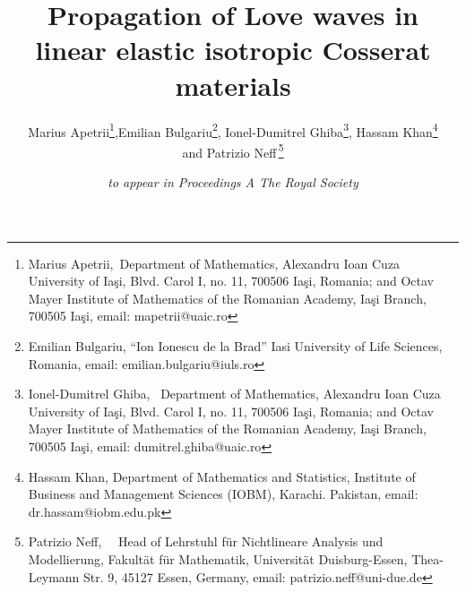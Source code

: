 \documentclass[10pt]{article}
\begin{document}
	
	\title{\vspace*{-1.75cm}   {Propagation} of Love waves in  {linear elastic} isotropic  Cosserat materials}
	
\author{Marius Apetrii\thanks{Marius Apetrii,\ Department of Mathematics,  Alexandru Ioan Cuza University of Ia\c si,  Blvd.
		Carol I, no. 11, 700506 Ia\c si,
		Romania; and  Octav Mayer Institute of Mathematics of the
		Romanian Academy, Ia\c si Branch,  700505 Ia\c si, email:  mapetrii@uaic.ro},\quad  Emilian Bulgariu\thanks{ Emilian Bulgariu,  {``Ion Ionescu de la Brad'' Iasi University of Life Sciences, Romania,  email:  emilian.bulgariu@iuls.ro}}, \quad  Ionel-Dumitrel Ghiba\thanks{ Ionel-Dumitrel Ghiba, \ Department of Mathematics,  Alexandru Ioan Cuza University of Ia\c si,  Blvd.
		Carol I, no. 11, 700506 Ia\c si,
		Romania; and  Octav Mayer Institute of Mathematics of the
		Romanian Academy, Ia\c si Branch,  700505 Ia\c si, email:  dumitrel.ghiba@uaic.ro}, \qquad Hassam Khan\thanks{Hassam Khan,    Department of Mathematics and Statistics,  Institute of Business and Management Sciences (IOBM), Karachi. Pakistan, email: dr.hassam@iobm.edu.pk}\vspace{2mm}\\  
		 {and} \quad  Patrizio Neff\,\thanks{Patrizio Neff,  \ \ Head of Lehrstuhl f\"{u}r Nichtlineare Analysis und Modellierung, Fakult\"{a}t f\"{u}r
		Mathematik, Universit\"{a}t Duisburg-Essen,  Thea-Leymann Str. 9, 45127 Essen, Germany, email: patrizio.neff@uni-due.de} }
\date{\it to appear in Proceedings A
	The Royal Society}
\maketitle
\end{document}
